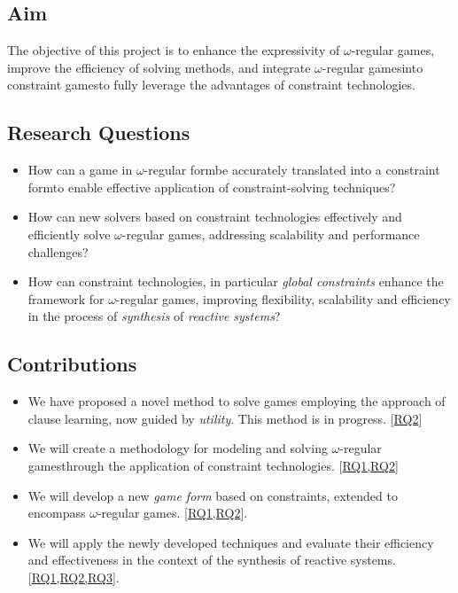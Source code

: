 \documentclass{article}
\makeatletter
\newcommand{\wregularform}{$\omega$-regular form\@ifnextchar{,}{}{\@ifnextchar{.}{}{ }}}
\newcommand{\wregulargames}{$\omega$-regular games\@ifnextchar{,}{}{\@ifnextchar{.}{}{ }}}
\newcommand{\constraintform}{constraint form\@ifnextchar{,}{}{\@ifnextchar{.}{}{ }}}
\newcommand{\constraintgames}{constraint games\@ifnextchar{,}{}{\@ifnextchar{.}{}{ }}}
\makeatother
\begin{document}
\subsection{Aim}

The objective of this project is to enhance the expressivity of \wregulargames, improve the efficiency of solving methods, and integrate \wregulargames into \constraintgames to fully leverage the advantages of constraint technologies.

\subsection{Research Questions} \label{sec:rq}

\begin{itemize}[left=1.2cm]
    \item [\textbf{RQ1}] How can a game in \wregularform be accurately translated into a \constraintform to enable effective application of constraint-solving techniques?
    
    \item [\textbf{RQ2}] How can new solvers based on constraint technologies effectively and efficiently solve \wregulargames, addressing scalability and performance challenges?
    
    \item [\textbf{RQ3}] How can constraint technologies, in particular \textit{global constraints} enhance the framework for \wregulargames, improving flexibility, scalability and efficiency in the process of \textit{synthesis} of \textit{reactive systems}?
\end{itemize}

\subsection{Contributions}

\begin{itemize}
    \item We have proposed a novel method to solve games employing the approach of clause learning, now guided by \textit{utility}. This method is in progress. [\hyperref[sec:rq]{RQ2}]
    \item We will create a methodology for modeling and solving \wregulargames through the application of constraint technologies. [\hyperref[sec:rq]{RQ1,RQ2}]
    \item We will develop a new \textit{game form} based on constraints, extended to encompass \wregulargames. [\hyperref[sec:rq]{RQ1,RQ2}].
    \item We will apply the newly developed techniques and evaluate their efficiency and effectiveness in the context of the synthesis of reactive systems. [\hyperref[sec:rq]{RQ1,RQ2,RQ3}].
\end{itemize}
\end{document}
